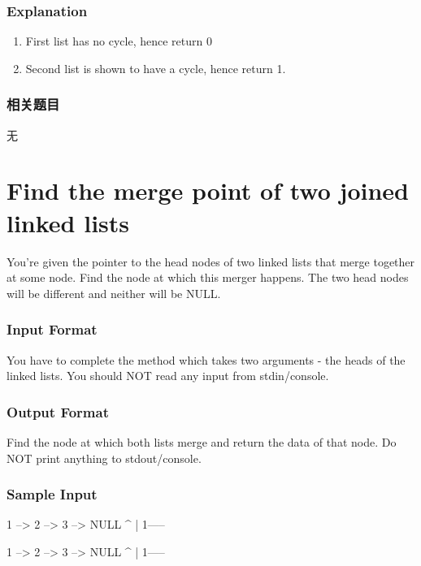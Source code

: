 \subsubsection{Explanation}
\begin{enumerate}
\item First list has no cycle, hence return 0 
\item Second list is shown to have a cycle, hence return 1.
\end{enumerate}


\subsubsection{相关题目}
\begindot
\item 无
\myenddot


\section{Find the merge point of two joined linked lists} %
\label{sec:Find-the-merge-point-of-two-joined-linked-lists}

You’re given the pointer to the head nodes of two linked lists that merge together at some node. Find the node at which this merger happens. The two head nodes will be different and neither will be NULL.


\subsubsection{Input Format}
You have to complete the  method which takes two arguments - the heads of the linked lists. You should NOT read any input from stdin/console.


\subsubsection{Output Format}
Find the node at which both lists merge and return the data of that node. Do NOT print anything to stdout/console.


\subsubsection{Sample Input}
\begin{Code}
1 --> 2 --> 3 --> NULL
      ^
      |
1-----                           

1 --> 2 --> 3 --> NULL
            ^
            |
      1----- 
\end{Code}


